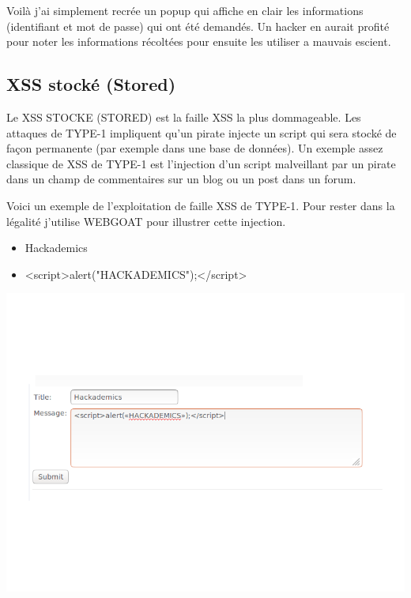 \begin{flushleft}
Voilà j'ai simplement recrée un popup qui affiche en clair les informations (identifiant et mot de passe) qui ont été demandés. Un hacker en aurait profité pour noter les informations récoltées pour ensuite les utiliser a mauvais escient.
\end{flushleft}

\subsection{XSS stocké (Stored)}
\label{vulnerabilites:web:xss:stored}
Le XSS STOCKE (STORED) est la faille XSS la plus dommageable. Les attaques de TYPE-1 impliquent qu'un pirate injecte un script qui sera stocké de façon permanente (par exemple dans une base de données). Un exemple assez classique de XSS de TYPE-1 est l'injection d'un script malveillant par un pirate dans un champ de commentaires sur un blog ou un post dans un forum.

\begin{flushleft}
Voici un exemple de l'exploitation de faille XSS de TYPE-1. Pour rester dans la légalité j'utilise WEBGOAT pour illustrer cette injection.
\end{flushleft}

\bigskip

\begin{itemize}
\item Hackademics
\item <script>alert("HACKADEMICS");</script>
\end{itemize}


\begin{center}
\includegraphics[scale=0.3]{Web/assets/xsst1-0.png}
\end{center}


